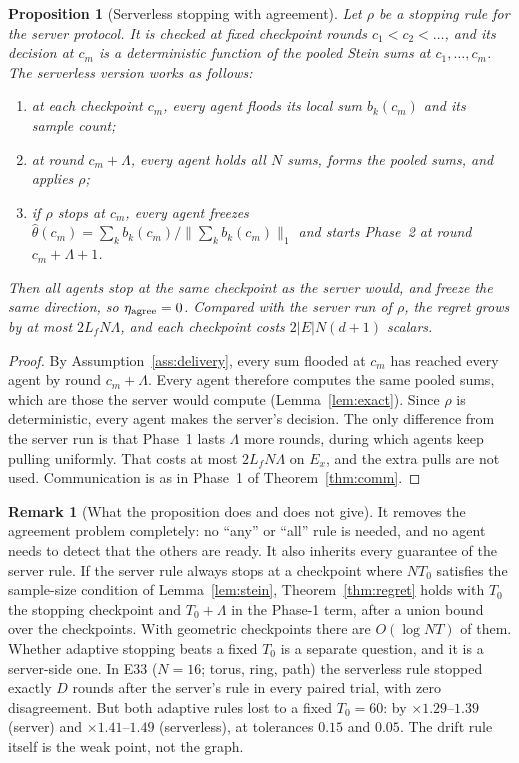 \documentclass[11pt]{article}
\newtheorem{proposition}[theorem]{Proposition}
\theoremstyle{definition}
\newtheorem{remark}{Remark}
\begin{document}
\begin{proposition}[Serverless stopping with agreement]\label{prop:stop}
Let $\rho$ be a stopping rule for the server protocol. It is checked at fixed checkpoint rounds $c_1<c_2<\dots$, and its
decision at $c_m$ is a deterministic function of the pooled Stein sums at $c_1,\dots,c_m$. The serverless version
works as follows:
\begin{enumerate}[nosep,label=(\alph*)]
\item at each checkpoint $c_m$, every agent floods its local sum $b_k(c_m)$ and its sample count;
\item at round $c_m+\Lambda$, every agent holds all $N$ sums, forms the pooled sums, and applies $\rho$;
\item if $\rho$ stops at $c_m$, every agent freezes $\hat\theta(c_m)=\sum_kb_k(c_m)/\|\sum_kb_k(c_m)\|_1$ and starts
Phase~2 at round $c_m+\Lambda+1$.
\end{enumerate}
Then all agents stop at the same checkpoint as the server would, and freeze the same direction, so $\eta_{\rm agree}=0$.
Compared with the server run of $\rho$, the regret grows by at most $2L_fN\Lambda$, and each checkpoint costs
$2|E|N(d+1)$ scalars.
\end{proposition}
\begin{proof}
By Assumption~\ref{ass:delivery}, every sum flooded at $c_m$ has reached every agent by round $c_m+\Lambda$. Every
agent therefore computes the same pooled sums, which are those the server would compute (Lemma~\ref{lem:exact}). Since
$\rho$ is deterministic, every agent makes the server's decision. The only difference from the server run is that
Phase~1 lasts $\Lambda$ more rounds, during which agents keep pulling uniformly. That costs at most $2L_fN\Lambda$
on $E_x$, and the extra pulls are not used. Communication is as in Phase~1 of Theorem~\ref{thm:comm}.
\end{proof}

\begin{remark}[What the proposition does and does not give]
It removes the agreement problem completely: no ``any'' or ``all'' rule is needed, and no agent needs to detect that
the others are ready. It also inherits every guarantee of the server rule. If the server rule always stops at a
checkpoint where $NT_0$ satisfies the sample-size condition of Lemma~\ref{lem:stein}, Theorem~\ref{thm:regret} holds
with $T_0$ the stopping checkpoint and $T_0+\Lambda$ in the Phase-1 term, after a union bound over the checkpoints.
With geometric checkpoints there are $O(\log NT)$ of them. Whether adaptive stopping beats a fixed $T_0$ is a separate
question, and it is a server-side one. In E33 ($N=16$; torus, ring, path) the serverless rule stopped exactly $D$
rounds after the server's rule in every paired trial, with zero disagreement. But both adaptive rules lost to a fixed
$T_0=60$: by $\times1.29$--$1.39$ (server) and $\times1.41$--$1.49$ (serverless), at tolerances $0.15$ and $0.05$.
The drift rule itself is the weak point, not the graph.
\end{remark}
\end{document}

